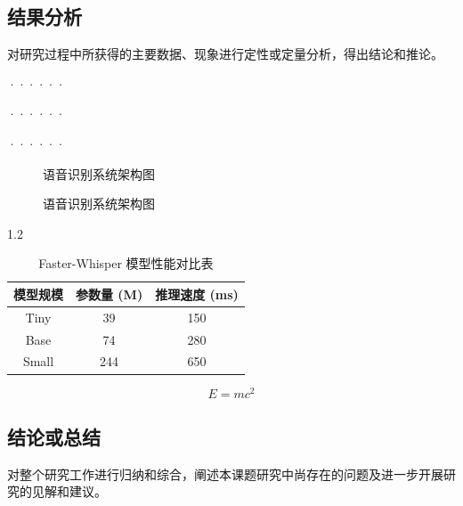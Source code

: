 \documentclass[a4paper, 12pt, twoside]{ctexart}
\begin{document}
\subsection{结果分析}
对研究过程中所获得的主要数据、现象进行定性或定量分析，得出结论和推论。

······

······

······

\begin{figure}[htbp]
    \centering
    \caption{语音识别系统架构图} %
    \label{fig:architecture1}
\end{figure}

\begin{figure}[htbp]
    \centering
    \caption{语音识别系统架构图} %
    \label{fig:architecture2}
\end{figure}

\begin{table}[htbp]
    \centering
    \caption{Faster-Whisper 模型性能对比表} %
    \begin{spacing}{1.2} %
    {\songti %
    \begin{tabular}{ccc}
        \toprule
        模型规模 & 参数量 (M) & 推理速度 (ms) \\
        \midrule
        Tiny   & 39   & 150 \\
        Base   & 74   & 280 \\
        Small  & 244  & 650 \\
        \bottomrule
    \end{tabular}}
    \end{spacing}
\end{table}

\begin{equation}
    E = mc^2
\end{equation}

\subsection{结论或总结}
对整个研究工作进行归纳和综合，阐述本课题研究中尚存在的问题及进一步开展研究的见解和建议。
\end{document}
